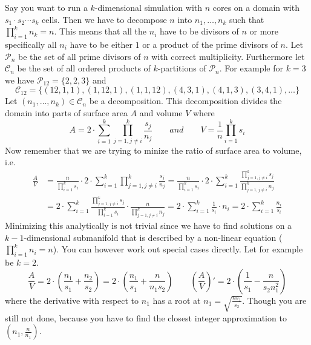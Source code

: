 Say you want to run a $k$-dimensional simulation with $n$ cores on a domain with
$s_{1} \cdot s_{2} \cdots s_{k}$ cells. Then we have to decompose $n$ into
$n_{1}, \dots, n_{k}$ such that $\prod_{i = 1}^{k} n_{k} = n$. This means that
all the $n_{i}$ have to be divisors of $n$ or more specifically all $n_{i}$ have
to be either $1$ or a product of the prime divisors of $n$. Let
$\mathcal{P}_{n}$ be the set of all prime divisors of $n$ with correct
multiplicity. Furthermore let $\mathcal{C}_{n}$ be the set of all ordered
products of $k$-partitions of $\mathcal{P}_{n}$. For example for $k = 3$ we have
$\mathcal{P}_{12} = \{ 2, 2, 3 \}$ and
\begin{equation*}
  \mathcal{C}_{12} = \{ (12, 1, 1), (1, 12, 1), (1, 1, 12), (4, 3, 1), (4, 1, 3), (3, 4, 1), \dots \}
\end{equation*}
Let $(n_{1}, \dots, n_{k}) \in \mathcal{C}_{n}$ be a decomposition. This
decomposition divides the domain into parts of surface area $A$ and volume $V$
where
\begin{equation*}
  A = 2 \cdot \sum_{i = 1}^{k} \prod_{j = 1, j \ne i}^{k} \frac{s_{j}}{n_{j}} \qquad \textit{and} \qquad V = \frac{1}{n} \prod_{i = 1}^{k} s_{i}
\end{equation*}
Now remember that we are trying to minize the ratio of surface area to volume,
i.e.
\begin{align*}
  \frac{A}{V} & = \frac{n}{\prod_{i = 1}^{k} s_{i}} \cdot 2 \cdot \sum_{i = 1}^{k} \prod_{j = 1, j \ne i}^{k} \frac{s_{j}}{n_{j}} = \frac{n}{\prod_{i = 1}^{k} s_{i}} \cdot 2 \cdot \sum_{i = 1}^{k} \frac{\prod_{j = 1, j \ne i}^{k} s_{j}}{\prod_{j = 1, j \ne i}^{k} n_{j}}\\
  & = 2 \cdot \sum_{i = 1}^{k} \frac{\prod_{j = 1, j \ne i}^{k} s_{j}}{\prod_{i = 1}^{k} s_{i}} \cdot \frac{n}{\prod_{j = 1, j \ne i}^{k} n_{j}} = 2 \cdot \sum_{i = 1}^{k} \frac{1}{s_{i}} \cdot n_{i} = 2 \cdot \sum_{i = 1}^{k} \frac{n_{i}}{s_{i}}
\end{align*}
Minimizing this analytically is not trivial since we have to find solutions on a
$k - 1$-dimensional submanifold that is described by a non-linear equation
($\prod_{i = 1}^{k} n_{i} = n$). You can however work out special cases
directly. Let for example be $k = 2$.
\begin{equation*}
  \frac{A}{V} = 2 \cdot \left( \frac{n_{1}}{s_{1}} + \frac{n_{2}}{s_{2}} \right) = 2 \cdot \left( \frac{n_{1}}{s_{1}} + \frac{n}{n_{1}s_{2}} \right) \qquad \left( \frac{A}{V} \right)' = 2 \cdot \left( \frac{1}{s_{1}} - \frac{n}{s_{2} n_{1}^{2}} \right)
\end{equation*}
where the derivative with respect to $n_{1}$ has a root at
$n_{1} = \sqrt{\frac{ns_{1}}{s_{2}}}$. Though you are still not done, because
you have to find the closest integer approximation to
$\left( n_{1}, \frac{n}{n_{1}} \right)$.

